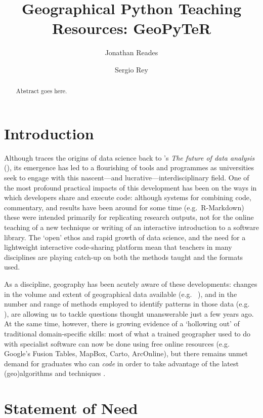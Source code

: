 \documentclass[letter, 11pt]{article}
\title{Geographical Python Teaching Resources: GeoPyTeR}
\author{Jonathan Reades \and Sergio Rey}
\newcommand{\eg}{e.g.~\/}
\begin{document}
\maketitle

\begin{abstract}
  Abstract goes here.
\end{abstract}


\section{Introduction}\label{introduction}

Although \citet{Donoho2017} traces the origins of data science back to
\citeauthor{Tukey1962}'s \textit{The future of data analysis}
(\citeyear{Tukey1962}), its emergence has led to a flourishing of tools and
programmes as universities seek to engage with this nascent---and
lucrative---interdisciplinary field. One of the most profound practical impacts
of this development has been on the ways in which developers share and execute
code: although systems for combining code, commentary, and results have been
around for some time (\eg R-Markdown) these were intended primarily for
replicating research outputs, not for the online teaching of a new technique or
writing of an interactive introduction to a software library. The `open' ethos
and rapid growth of data science, and the need for a lightweight interactive
code-sharing platform mean that teachers in many disciplines are playing
catch-up on both the methods taught and the formats used.

As a discipline, geography has been acutely aware of these developments: changes
in the volume and extent of geographical data available (\eg
\citealp{Graham2013,gonzalez2013big,reades2016}), and in the number and range of
methods employed to identify patterns in those data (\eg
\citealp{Fan2016,Naik2017,Santibanez2015,Stevens2015,ArribasBel2017}), are
allowing us to tackle questions thought unanswerable just a few years ago. At
the same time, however, there is growing evidence of a `hollowing out' of
traditional domain-specific skills: most of what a trained geographer used to do
with specialist software can now be done using free online resources (\eg
Google's Fusion Tables, MapBox, Carto, ArcOnline), but there remains unmet
demand for graduates who can \textit{code} in order to take advantage of the
latest (geo)algorithms and techniques \citep{Singleton2014,Singleton2016}.

\section{Statement of Need}
\end{document}
